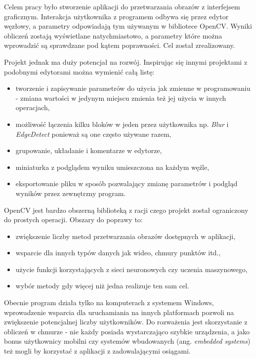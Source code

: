 Celem pracy było stworzenie aplikacji do przetwarzania obrazów z interfejsem graficznym.
Interakcja użytkownika z programem odbywa się przez edytor węzłowy, a parametry odpowiadają tym używanym w bibliotece OpenCV. 
Wyniki obliczeń zostają wyświetlane natychmiastowo, a parametry które można wprowadzić są sprawdzane pod kątem poprawności.  
Cel został zrealizowany.

Projekt jednak ma duży potencjał na rozwój. Inspirując się innymi projektami z podobnymi edytorami można wymienić całą listę: 
\begin{itemize}
    \item tworzenie i zapisywanie parametrów do użycia jak zmienne w programowaniu - zmiana wartości w jedynym miejscu zmienia też jej użycia w innych operacjach,
    \item możliwość łączenia kilku bloków w jeden przez użytkownika np. \textit{Blur} i \textit{EdgeDetect} ponieważ są one często używane razem,
    \item grupowanie, układanie i komentarze w edytorze,
    \item miniaturka z podglądem wyniku umieszczona na każdym węźle,
    \item eksportowanie pliku w sposób pozwalający zmianę parametrów i podgląd wyników przez zewnętrzny program.
\end{itemize}

OpenCV jest bardzo obszerną biblioteką z racji czego projekt został ograniczony do prostych operacji. Obszary do poprawy to:
\begin{itemize}
    \item zwiększenie liczby metod przetwarzania obrazów dostępnych w aplikacji,
    \item wsparcie dla innych typów danych jak wideo, chmury punktów itd.,
    \item użycie funkcji korzystających z sieci neuronowych czy uczenia maszynowego,
    \item wybór metody gdy więcej niż jedna realizuje ten sam cel.
\end{itemize}

Obecnie program działa tylko na komputerach z systemem Windows, wprowadzenie wsparcia dla uruchamiania na innych platformach pozwoli na zwiększenie potencjalnej liczby użytkowników. Do rozważenia jest skorzystanie z obliczeń w chmurze - nie każdy posiada wystarczająco szybkie urządzenia, a jako bonus użytkownicy mobilni czy systemów wbudowanych (ang. \textit{embedded systems}) też mogli by korzystać z aplikacji z zadowalającymi osiągami. 